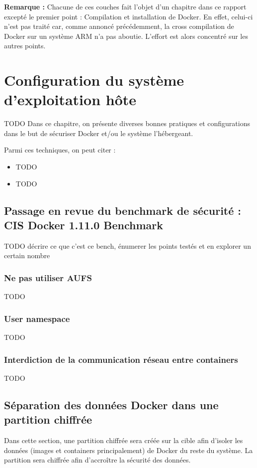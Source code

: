 \documentclass[11pt,a4paper,oneside]{report}
\begin{document}
\textbf{Remarque : } Chacune de ces couches fait l'objet d'un chapitre dans ce rapport excepté le premier point : Compilation et installation de Docker. En effet, celui-ci n'est pas traité car, comme annoncé précédemment, la cross compilation de Docker sur un système ARM n'a pas aboutie. L'effort est alors concentré sur les autres points.


\chapter{Configuration du système d'exploitation hôte}\label{config_systeme_os_hote}
TODO 
Dans ce chapitre, on présente diverses bonnes pratiques et configurations dans le but de sécuriser Docker et/ou le système l'hébergeant.

Parmi ces techniques, on peut citer :

\begin{itemize}
\item TODO
\item TODO
\end{itemize}


\section{Passage en revue du benchmark de sécurité : CIS Docker 1.11.0 Benchmark}
TODO décrire ce que c'est ce bench, énumerer les points testés et en explorer un certain nombre


\subsection{Ne pas utiliser AUFS}
TODO


\subsection{User namespace}
TODO


\subsection{Interdiction de la communication réseau entre containers}
TODO


\section{Séparation des données Docker dans une partition chiffrée}
Dans cette section, une partition chiffrée sera créée sur la cible afin d'isoler les données (images et containers principalement) de Docker du reste du système. La partition sera chiffrée afin d'accroître la sécurité des données.
\end{document}
